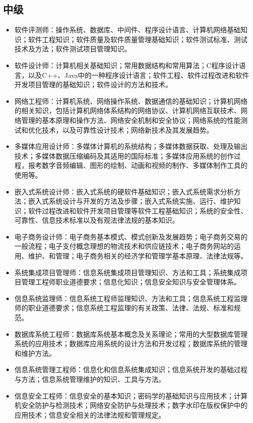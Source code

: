 \subsection{中级}
\begin{itemize}
\item 软件评测师：操作系统、数据库、中间件、程序设计语言、计算机网络基础知识；软件工程知识；软件质量及软件质量管理基础知识；软件测试标准、测试技术及方法；软件测试项目管理知识。
\item 软件设计师：计算机相关基础知识；常用数据结构和常用算法；C程序设计语言，以及C++、Java中的一种程序设计语言；软件工程、软件过程改进和软件开发项目管理的基础知识；软件设计的方法和技术。
\item 网络工程师：计算机系统、网络操作系统、数据通信的基础知识；计算机网络的相关知识，包括计算机网络体系结构的网络协议、计算机网络互联技术、网络管理的基本原理和操作方法、网络安全机制和安全协议；网络系统的性能测试和优化技术，以及可靠性设计技术；网络新技术及其发展趋势。
\item 多媒体应用设计师：多媒体计算机的系统结构；多媒体数据获取、处理及输出技术；多媒体数据压缩编码及其适用的国际标准；多媒体应用系统的创作过程，报考数字音频编辑、图形的绘制、动画和视频的制作、多媒体制作工具的使用等。
\item 嵌入式系统设计师：嵌入式系统的硬软件基础知识；嵌入式系统需求分析方法；嵌入式系统设计与开发的方法及步骤；嵌入式系统实施、运行、维护知识；软件过程改进和软件开发项目管理等软件工程基础知识；系统的安全性、可靠性、信息技术标准以及有观法律法规的基本知识。
\item 电子商务设计师：电子商务基本模式、模式创新及发展趋势；电子商务交易的一般流程；电子支付概念理想的物流技术和供应链技术；电子商务网站的运用、维护、和管理；电子商务相关的经济学和管理学基本原理、法律法规等。
\item 系统集成项目管理师：信息系统集成项目管理知识、方法和工具；系统集成项目管理工程师职业道德要求；信息化知识；信息安全知识与安全管理体系。
\item 信息系统监理师：信息系统工程师监理知识、方法和工具；信息系统工程监理师的职业道德要求；信息系统工程监理的有关政策、法律、法规、标准和规范。
\item 数据库系统工程师：数据库系统基本概念及关系理论；常用的大型数据库管理系统的应用技术；数据库应用系统的设计方法和开发过程；数据库系统的管理和维护方法。
\item 信息系统管理工程师：信息化和信息系统集成知识；信息系统开发的基础过程与方法；信息系统管理维护的知识、工具与方法。
\item 信息安全工程师：信息安全的基本知识；密码学的基础知识与应用技术；计算机安全防护与检测技术；网络安全防护与处理技术；数字水印在版权保护中的应用技术；信息安全相关的法律法规和管理规定。
\end{itemize}

